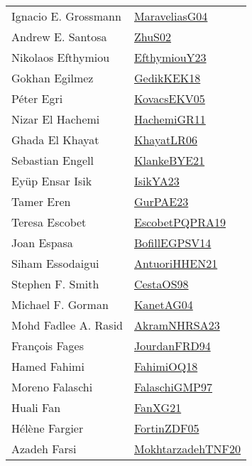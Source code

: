 {\begin{longtable}{p{4cm}p{20cm}}
Ignacio E. Grossmann & \href{papers/MaraveliasG04.pdf}{MaraveliasG04}\cite{MaraveliasG04} \\
Andrew E. Santosa & \href{papers/ZhuS02.pdf}{ZhuS02}\cite{ZhuS02} \\
Nikolaos Efthymiou & \href{papers/EfthymiouY23.pdf}{EfthymiouY23}\cite{EfthymiouY23} \\
Gokhan Egilmez & \href{articles/GedikKEK18.pdf}{GedikKEK18}\cite{GedikKEK18} \\
P{\'{e}}ter Egri & \href{papers/KovacsEKV05.pdf}{KovacsEKV05}\cite{KovacsEKV05} \\
Nizar El Hachemi & \href{articles/HachemiGR11.pdf}{HachemiGR11}\cite{HachemiGR11} \\
Ghada El Khayat & \href{articles/KhayatLR06.pdf}{KhayatLR06}\cite{KhayatLR06} \\
Sebastian Engell & \href{papers/KlankeBYE21.pdf}{KlankeBYE21}\cite{KlankeBYE21} \\
Ey{\"{u}}p Ensar Isik & \href{articles/IsikYA23.pdf}{IsikYA23}\cite{IsikYA23} \\
Tamer Eren & \href{articles/GurPAE23.pdf}{GurPAE23}\cite{GurPAE23} \\
Teresa Escobet & \href{articles/EscobetPQPRA19.pdf}{EscobetPQPRA19}\cite{EscobetPQPRA19} \\
Joan Espasa & \href{papers/BofillEGPSV14.pdf}{BofillEGPSV14}\cite{BofillEGPSV14} \\
Siham Essodaigui & \href{papers/AntuoriHHEN21.pdf}{AntuoriHHEN21}\cite{AntuoriHHEN21} \\
Stephen F. Smith & \href{papers/CestaOS98.pdf}{CestaOS98}\cite{CestaOS98} \\
Michael F. Gorman & \href{}{KanetAG04}\cite{KanetAG04} \\
Mohd Fadlee A. Rasid & \href{articles/AkramNHRSA23.pdf}{AkramNHRSA23}\cite{AkramNHRSA23} \\
Fran{\c{c}}ois Fages & \href{}{JourdanFRD94}\cite{JourdanFRD94} \\
Hamed Fahimi & \href{articles/FahimiOQ18.pdf}{FahimiOQ18}\cite{FahimiOQ18} \\
Moreno Falaschi & \href{articles/FalaschiGMP97.pdf}{FalaschiGMP97}\cite{FalaschiGMP97} \\
Huali Fan & \href{articles/FanXG21.pdf}{FanXG21}\cite{FanXG21} \\
H{\'{e}}l{\`{e}}ne Fargier & \href{papers/FortinZDF05.pdf}{FortinZDF05}\cite{FortinZDF05} \\
Azadeh Farsi & \href{}{MokhtarzadehTNF20}\cite{MokhtarzadehTNF20} \\

\end{longtable}}
